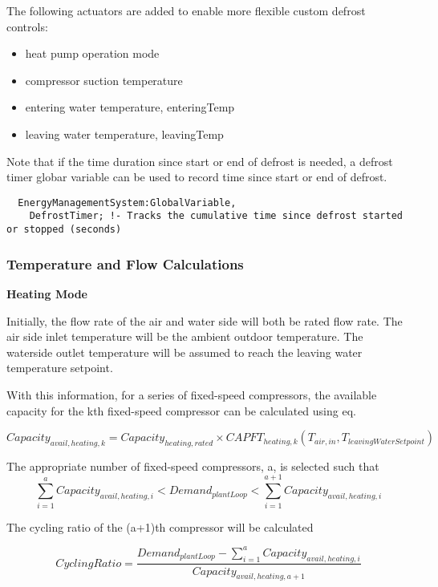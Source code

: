 The following actuators are added to enable more flexible custom defrost controls:
\begin{itemize}
  \item heat pump operation mode
  \item compressor suction temperature
  \item entering water temperature, enteringTemp
  \item leaving water temperature, leavingTemp
\end{itemize}
Note that if the time duration since start or end of defrost is needed, a
defrost timer globar variable can be used to record time since start or end of
defrost.
\begin{verbatim}
  EnergyManagementSystem:GlobalVariable,
    DefrostTimer; !- Tracks the cumulative time since defrost started or stopped (seconds)
\end{verbatim}

\subsubsection{Temperature and Flow Calculations}
\noindent\textbf{Heating Mode}

Initially, the flow rate of the air and water side will both be rated flow rate.
The air side inlet temperature will be the ambient outdoor temperature. The
waterside outlet temperature will be assumed to reach the leaving water
temperature setpoint.

With this information, for a series of fixed-speed compressors, the available
capacity for the kth fixed-speed compressor can be calculated using eq.

\begin{equation}
Capacity_{avail,heating,k}=Capacity_{heating,rated} \times CAPFT_{heating,k}(T_{air,in},T_{leavingWaterSetpoint}) 
\end{equation}

The appropriate number of fixed-speed compressors, a, is selected such that
\begin{equation}
\sum_{i=1}^{a} Capacity_{avail,heating,i} < Demand_{plantLoop} < \sum_{i=1}^{a+1} Capacity_{avail,heating,i} 
\end{equation}

The cycling ratio of the (a+1)th compressor will be calculated

\begin{equation}
CyclingRatio = \frac{Demand_{plantLoop} - \sum_{i=1}^{a} Capacity_{avail,heating,i}}{Capacity_{avail,heating,a+1}} 
\end{equation}

